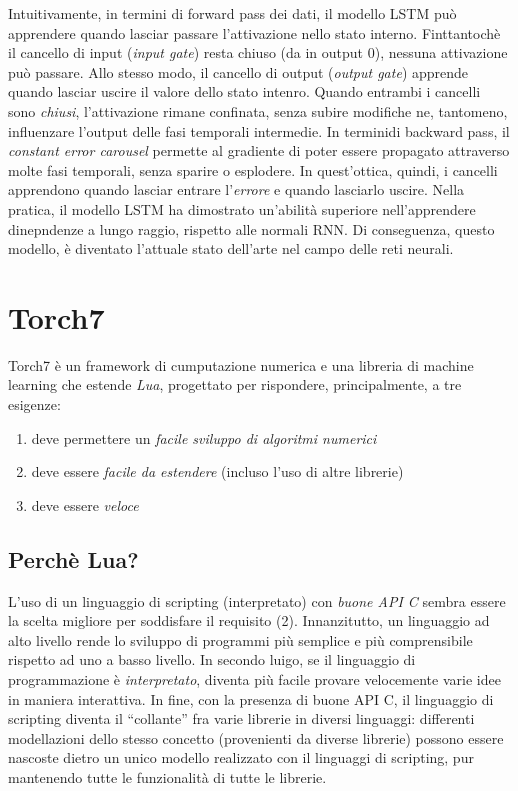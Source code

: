 Intuitivamente, in termini di forward pass dei dati, il modello LSTM pu\`o apprendere quando lasciar passare l'attivazione nello stato interno.
Finttantoch\`e il cancello di input (\emph{input gate}) resta chiuso (da in output 0), nessuna attivazione pu\`o passare.
Allo stesso modo, il cancello di output (\emph{output gate}) apprende quando lasciar uscire il valore dello stato intenro.
Quando entrambi i cancelli sono \emph{chiusi}, l'attivazione rimane confinata, senza subire modifiche ne, tantomeno, influenzare l'output delle fasi temporali intermedie.
In terminidi backward pass, il \emph{constant error carousel} permette al gradiente di poter essere propagato attraverso molte fasi temporali, senza sparire o esplodere.
In quest'ottica, quindi, i cancelli apprendono quando lasciar entrare l'\emph{errore} e quando lasciarlo uscire.
Nella pratica, il modello LSTM ha dimostrato un'abilit\`a superiore nell'apprendere dinepndenze a lungo raggio, rispetto alle normali RNN.
Di conseguenza, questo modello, \`e diventato l'attuale stato dell'arte nel campo delle reti neurali.

\section{Torch7}
\label{sec:torch}
\nocite{Collobert:2011}

Torch7 \`e un framework di cumputazione numerica e una libreria di machine learning che estende \emph{Lua}, progettato per rispondere, principalmente, a tre esigenze:
\begin{enumerate}
  \item deve permettere un \emph{facile sviluppo di algoritmi numerici}
  \item deve essere \emph{facile da estendere} (incluso l'uso di altre librerie)
  \item deve essere \emph{veloce}
\end{enumerate}

\subsection{Perch\`e Lua?}
L'uso di un linguaggio di scripting (interpretato) con \emph{buone API C} sembra essere la scelta migliore per soddisfare il requisito (2).
Innanzitutto, un linguaggio ad alto livello rende lo sviluppo di programmi pi\`u semplice e pi\`u comprensibile rispetto ad uno a basso livello.
In secondo luigo, se il linguaggio di programmazione \`e \emph{interpretato}, diventa pi\`u facile provare velocemente varie idee in maniera interattiva.
In fine, con la presenza di buone API C, il linguaggio di scripting diventa il ``collante'' fra varie librerie in diversi linguaggi: differenti modellazioni dello stesso concetto (provenienti da diverse librerie) possono essere nascoste dietro un unico modello realizzato con il linguaggi di scripting, pur mantenendo tutte le funzionalit\`a di tutte le librerie.

